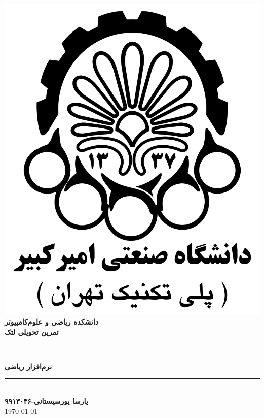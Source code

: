 \documentclass[]{article}
\author{پارسا پورسیستانی-۹۹۱۳۰۳۶}
\begin{document}
\begin{titlepage}

\newcommand{\HRule}{\rule{\linewidth}{0.5mm}} 

\center 

\includegraphics[scale=0.15]{logo2.png}\\[1cm]
\textsc{\LARGE \bfseries دانشکده ریاضی و علوم‌کامپیوتر}\\[0.7cm] 
\textsc{\Large \bfseries تمرین تحویلی لتک}\\[0.5cm] 
\HRule \\[0.4cm]
{ \huge \bfseries نرم‌افزار ریاضی}\\[0.4cm]
\HRule \\[1cm]
\textsc{\LARGE \bfseries پارسا پورسیستانی-۹۹۱۳۰۳۶}\\[0.7cm]
\today
\end{titlepage}
  
\end{document}
